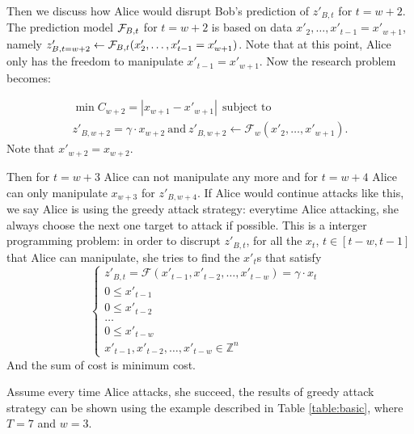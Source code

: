 \documentclass[journal]{IEEEtran}
\begin{document}
Then we discuss how Alice would disrupt Bob's prediction of $z'_{B,t}$ for $t= w+2$. The prediction model ${\cal F}_{B,t}$ for $t= w+2$ is based on data $x'_{2},\ldots,x'_{t-1}=x'_{w+1}$, namely $z'_{B,t=w+2}\leftarrow {\cal F}_{B,t}(x'_{2},\ldots,x'_{t-1}=x'_{w+1})$. Note that at this point, Alice only has the freedom to manipulate $x'_{t-1}=x'_{w+1}$. Now the research problem becomes:

\begin{eqnarray}
\label{eq:single-step-objective}
\min C_{w+2}=\left|x_{w+1}-x'_{w+1}\right| ~~\text{subject to}~~ \\ 
z'_{B,w+2}=\gamma \cdot x_{w+2}~\text{and}~
z'_{B,w+2}\leftarrow\mathcal{F}_{w}(x'_2,\ldots,x'_{w+1}).
\end{eqnarray}
Note that $x'_{w+2}=x_{w+2}$.

Then for $t=w+3$ Alice can not manipulate any more and for $t=w+4$ Alice can only manipulate $x_{w+3}$ for $z'_{B,w+4}$. {\color{purple}If Alice would continue attacks like this, we say Alice is using the greedy attack strategy: everytime Alice attacking, she always choose the next one target to attack if possible. This is a interger programming problem: in order to discrupt $z'_{B,t}$, for all the $x_t$, $t\in[t-w, t-1]$ that Alice can manipulate, she tries to find the $x'_t$s that satisfy
\begin{equation}
\left\{
             \begin{array}{lr}
             z'_{B,t}=\mathcal{F}(x'_{t-1}, x'_{t-2}, \dots, x'_{t-w})=\gamma \cdot x_t &  \\
             0 \leq x'_{t-1}\\
             0 \leq x'_{t-2}\\
             \dots          \\
             0 \leq x'_{t-w}\\
             x'_{t-1}, x'_{t-2}, \dots, x'_{t-w}\in\mathbb{Z}^{n}
             \end{array}
\right.
\end{equation}
And the sum of cost is minimum cost.
}

Assume every time Alice attacks, she succeed, the results {\color{purple}of greedy attack strategy} can be shown using the example described in Table \ref{table:basic}, where $T=7$ and $w=3$.
\end{document}
